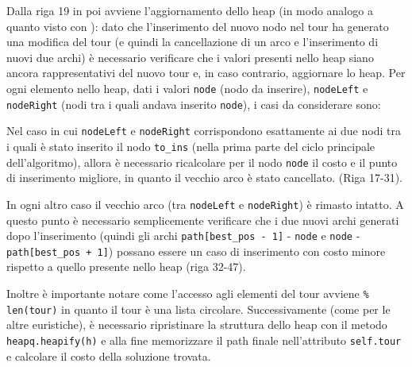 \documentclass[a4paper,12pt]{report}
\begin{document}
Dalla riga 19 in poi avviene l'aggiornamento dello heap (in modo analogo a quanto visto con ): dato che l'inserimento del nuovo nodo nel tour ha generato una modifica del tour (e quindi la cancellazione di un arco e l'inserimento di nuovi due archi) è necessario verificare che i valori presenti nello heap siano ancora rappresentativi del nuovo tour e, in caso contrario, aggiornare lo heap. Per ogni elemento nello heap, dati i valori \lstinline!node! (nodo da inserire), \lstinline!nodeLeft! e \lstinline!nodeRight! (nodi tra i quali andava inserito \lstinline!node!), i casi da considerare sono:
\begin{legal}
  \item Nel caso in cui \lstinline!nodeLeft! e \lstinline!nodeRight! corrispondono esattamente ai due nodi tra i quali è stato inserito il nodo \lstinline!to_ins! (nella prima parte del ciclo principale dell'algoritmo), allora è necessario ricalcolare per il nodo \lstinline!node! il costo e il punto di inserimento migliore, in quanto il vecchio arco è stato cancellato. (Riga 17-31).
  \item In ogni altro caso il vecchio arco (tra \lstinline!nodeLeft! e \lstinline!nodeRight!) è rimasto intatto. A questo punto è necessario semplicemente verificare che i due nuovi archi generati dopo l'inserimento (quindi gli archi \lstinline!path[best_pos - 1]! - \lstinline!node! e \lstinline!node! - \lstinline!path[best_pos + 1]!) possano essere un caso di inserimento con costo minore rispetto a quello presente nello heap (riga 32-47).
\end{legal}
Inoltre è importante notare come l'accesso agli elementi del tour avviene \lstinline!% len(tour)! in quanto il tour è una lista circolare.
Successivamente (come per le altre euristiche), è necessario ripristinare la struttura dello heap con il metodo \lstinline!heapq.heapify(h)! e alla fine memorizzare il path finale nell'attributo \lstinline!self.tour! e calcolare il costo della soluzione trovata.
\end{document}
